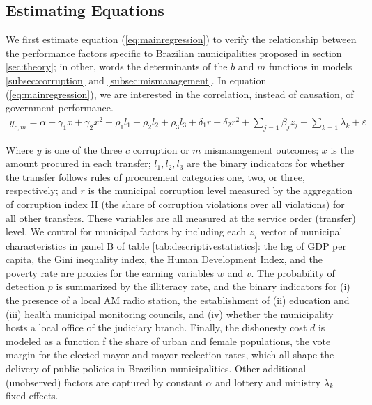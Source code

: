 \documentclass[11pt]{article}
\begin{document}
\subsection{Estimating Equations} \label{subsec:equations}

We first estimate equation (\ref{eq:mainregression}) to verify the relationship between the performance factors specific to Brazilian municipalities proposed in section \ref{sec:theory}; in other, words the determinants of the $b$ and $m$ functions in models \ref{subsec:corruption} and \ref{subsec:mismanagement}. In equation (\ref{eq:mainregression}), we are interested in the correlation, instead of causation, of government performance.
\begin{equation} \label{eq:mainregression}
  \begin{aligned}
    y_{c,m} = \alpha + \gamma_{1}x + \gamma_{2}x^{2} + \rho_{1}l_{1} + \rho_{2}l_{2} + \rho_{3}l_{3} + \delta_{1}r + \delta_{2}r^{2} + \sum_{j = 1} \beta_{j} z_{j} + \sum_{k = 1} \lambda_{k} + \varepsilon %
  \end{aligned}
\end{equation}

Where $y$ is one of the three $c$ corruption or $m$ mismanagement outcomes; $x$ is the amount procured in each transfer; $l_{1}, l_{2}, l_{3}$ are the binary indicators for whether the transfer follows rules of procurement categories one, two, or three, respectively; and $r$ is the municipal corruption level measured by the aggregation of corruption index II (the share of corruption violations over all violations) for all other transfers. These variables are all measured at the service order (transfer) level. We control for municipal factors by including each $z_{j}$ vector of municipal characteristics in panel B of table \ref{tab:descriptivestatistics}: the log of GDP per capita, the Gini inequality index, the Human Development Index, and the poverty rate are proxies for the earning variables $w$ and $v$. The probability of detection $p$ is summarized by the illiteracy rate, and the binary indicators for (i) the presence of a local AM radio station, the establishment of (ii) education and (iii) health municipal monitoring councils, and (iv) whether the municipality hosts a local office of the judiciary branch. Finally, the dishonesty cost $d$ is modeled as a function f the share of urban and female populations, the vote margin for the elected mayor and mayor reelection rates, which all shape the delivery of public policies in Brazilian municipalities. Other additional (unobserved) factors are captured by constant $\alpha$ and lottery and ministry $\lambda_{k}$ fixed-effects.
\end{document}
